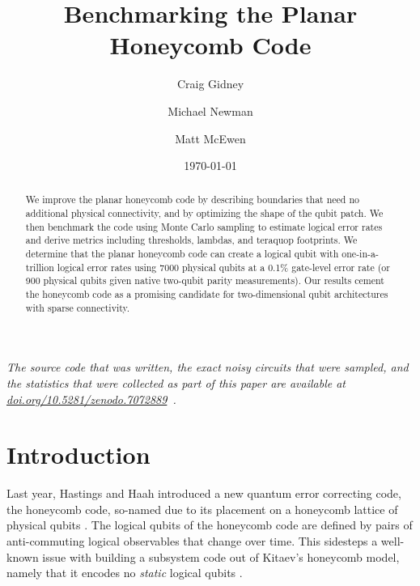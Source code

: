 \documentclass[onecolumn,a4paper,accepted=2022-09-12]{quantumarticle}
\theoremstyle{definition}
\theoremstyle{definition}
\theoremstyle{definition}
\begin{document}
\title{Benchmarking the Planar Honeycomb Code}

\date{\today}
\author{Craig Gidney}

\author{Michael Newman}

\author{Matt McEwen}

\begin{abstract}
We improve the planar honeycomb code by describing boundaries that need no additional physical connectivity, and by optimizing the shape of the qubit patch.
We then benchmark the code using Monte Carlo sampling to estimate logical error rates and derive metrics including thresholds, lambdas, and teraquop footprints.
We determine that the planar honeycomb code can create a logical qubit with one-in-a-trillion logical error rates using 7000 physical qubits at a 0.1\% gate-level error rate (or 900 physical qubits given native two-qubit parity measurements).
Our results cement the honeycomb code as a promising candidate for two-dimensional qubit architectures with sparse connectivity.
\end{abstract}

\emph{The source code that was written, the exact noisy circuits that were sampled, and the statistics that were collected as part of this paper are available at \href{https://doi.org/10.5281/zenodo.7072889}{doi.org/10.5281/zenodo.7072889}~\cite{gidneyhoneycombdata2022}.}

\maketitle

\section{Introduction}
\label{sec:introduction}

Last year, Hastings and Haah introduced a new quantum error correcting code, the honeycomb code, so-named due to its placement on a honeycomb lattice of physical qubits \cite{hastings2021dynamically}.
The logical qubits of the honeycomb code are defined by pairs of anti-commuting logical observables that change over time.  
This sidesteps a well-known issue with building a subsystem code out of Kitaev's honeycomb model, namely that it encodes no \emph{static} logical qubits \cite{kitaev2006anyons, suchara2011constructions, lee2017topological, wootton2021hexagonal}.
\end{document}
